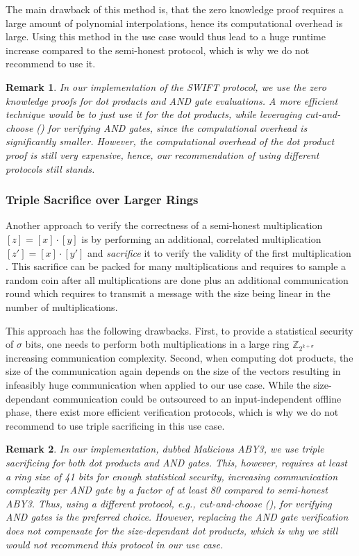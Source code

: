 \documentclass[a4paper,11pt,
]{article}
\newtheorem{remark}{Remark}
\newcommand{\Z}{\ensuremath{\mathbb{Z}}\xspace}
\newcommand{\shared}[1]{\ensuremath{[{#1}]}}
\begin{document}
The main drawback of this method is, that the zero knowledge proof requires a large amount of polynomial interpolations, hence its computational overhead is large. Using this method in the use case would thus lead to a huge runtime increase compared to the semi-honest protocol, which is why we do not recommend to use it.

\begin{remark}
    In our implementation of the SWIFT protocol, we use the zero knowledge proofs for dot products and AND gate evaluations. A more efficient technique would be to just use it for the dot products, while leveraging cut-and-choose () for verifying AND gates, since the computational overhead is significantly smaller. However, the computational overhead of the dot product proof is still very expensive, hence, our recommendation of using different protocols still stands.
\end{remark}

\subsubsection{Triple Sacrifice over Larger Rings} \label{sec::sacrifice}

Another approach to verify the correctness of a semi-honest multiplication $\shared{z} = \shared{x} \cdot \shared{y}$ is by performing an additional, correlated multiplication $\shared{z'} = \shared{x} \cdot \shared{y'}$ and \textit{sacrifice} it to verify the validity of the first multiplication \cite{DBLP:conf/acns/AbspoelD0N21}. This sacrifice can be packed for many multiplications and requires to sample a random coin after all multiplications are done plus an additional communication round which requires to transmit a message with the size being linear in the number of multiplications.

This approach has the following drawbacks. First, to provide a statistical security of $\sigma$ bits, one needs to perform both multiplications in a large ring $\Z_{2^{k+\sigma}}$ increasing communication complexity. Second, when computing dot products, the size of the communication again depends on the size of the vectors resulting in infeasibly huge communication when applied to our use case. While the size-dependant communication could be outsourced to an input-independent offline phase, there exist more efficient verification protocols, which is why we do not recommend to use triple sacrificing in this use case.

\begin{remark}
    In our implementation, dubbed Malicious ABY3, we use triple sacrificing for both dot products and AND gates. This, however, requires at least a ring size of 41 bits for enough statistical security, increasing communication complexity per AND gate by a factor of at least 80 compared to semi-honest ABY3. Thus, using a different protocol, e.g., cut-and-choose (), for verifying AND gates is the preferred choice. However, replacing the AND gate verification does not compensate for the size-dependant dot products, which is why we still would not recommend this protocol in our use case.
\end{remark}
\end{document}
